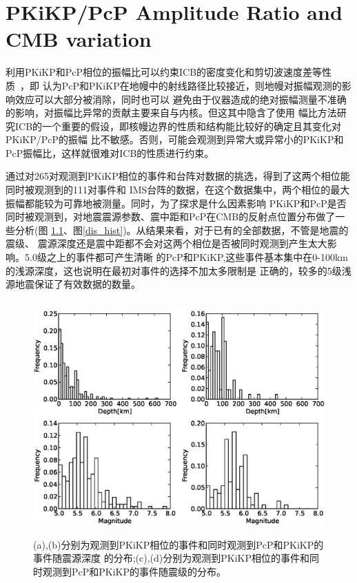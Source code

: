 \chapter{PKiKP/PcP Amplitude Ratio and CMB variation}

利用PKiKP和PcP相位的振幅比可以约束ICB的密度变化和剪切波速度差等性质~\citep{Koper2004a}，即
认为PcP和PKiKP在地幔中的射线路径比较接近，则地幔对振幅观测的影响效应可以大部分被消除，同时也可以
避免由于仪器造成的绝对振幅测量不准确的影响，对振幅比异常的贡献主要来自与内核。但这其中隐含了使用
幅比方法研究ICB的一个重要的假设，即核幔边界的性质和结构能比较好的确定且其变化对PKiKP/PcP的振幅
比不敏感。否则，可能会观测到异常大或异常小的PKiKP和PcP振幅比，这样就很难对ICB的性质进行约束。

通过对265对观测到PKiKP相位的事件和台阵对数据的挑选，得到了这两个相位能同时被观测到的111对事件和
IMS台阵的数据，在这个数据集中，两个相位的最大振幅都能较为可靠地被测量。同时，为了探求是什么因素影响
PKiKP和PcP是否同时被观测到，对地震震源参数、震中距和PcP在CMB的反射点位置分布做了一些分析(图
\ref{dep_mag_hist}、图\ref{dis_hist})。从结果来看，对于已有的全部数据，不管是地震的震级、
震源深度还是震中距都不会对这两个相位是否被同时观测到产生太大影响。5.0级之上的事件都可产生清晰
的PcP和PKiKP,这些事件基本集中在0-100km的浅源深度，这也说明在最初对事件的选择不加太多限制是
正确的，较多的5级浅源地震保证了有效数据的数量。

\begin{figure}[!ht]
	\centering
	\includegraphics[width=12cm,height=9cm]{fig/chap4/depmag_hist.eps}
	\caption{(a),(b)分别为观测到PKiKP相位的事件和同时观测到PcP和PKiKP的事件随震源深度%
的分布;(c),(d)分别为观测到PKiKP相位的事件和同时观测到PcP和PKiKP的事件随震级的分布。}
	\label{dep_mag_hist}
\end{figure}

